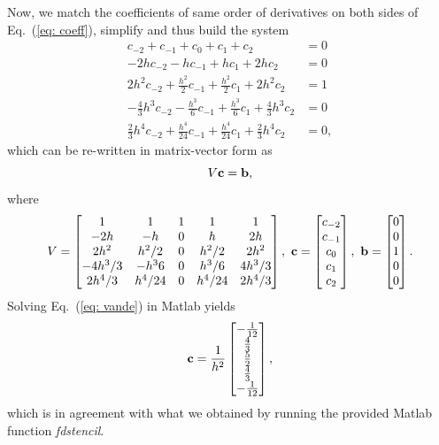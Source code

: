\documentclass[aps,prl,preprint,groupedaddress]{revtex4-1}
\begin{document}
Now, we match the coefficients of same order of derivatives on both sides of Eq.~(\ref{eq: coeff}), simplify and thus build the system
\begin{align*}
c_{-2}+c_{-1}+c_{0}+c_{1}+c_{2}&=0\nonumber\\
-2hc_{-2}-hc_{-1}+hc_{1}+2hc_{2}&=0\nonumber\\
2h^{2}c_{-2}+\frac{h^2}{2}c_{-1}+\frac{h^{2}}{2}c_{1}+2h^{2}c_{2}&=1\nonumber\\
-\frac{4}{3}h^{3}c_{-2}-\frac{h^{3}}{6}c_{-1}+\frac{h^{3}}{6}c_{1}+\frac{4}{3}h^{3}c_{2}&=0\nonumber\\
\frac{2}{3}h^{4}c_{-2}+\frac{h^{4}}{24}c_{-1}+\frac{h^4}{24}c_{1}+\frac{2}{3}h^{4}c_{2}&=0,
\end{align*}
which can be re-written in matrix-vector form as 
\begin{equation}\label{eq: vande}
V{\bf c} = {\bf b},
\end{equation}
where
\[
V=\begin{bmatrix}
1 & 1 & 1 & 1 & 1\\
-2h & -h & 0 & h &2h\\
2h^2 & h^{2}/2 & 0 & h^{2}/2 & 2h^{2}\\
-4h^{3}/3 & -h^{3}{6} & 0 & h^{3}/6 & 4h^{3}/3\\
2h^{4}/3 & h^{4}/24 & 0 & h^{4}/24 & 2h^{4}/3\\ 
\end{bmatrix},~{\bf c}=\begin{bmatrix}
c_{-2}\\
c_{-1}\\
c_{0}\\
c_{1}\\
c_{2}
\end{bmatrix},~{\bf b}=\begin{bmatrix}
0\\
0\\
1\\
0\\
0\\
\end{bmatrix}.
\]
Solving Eq.~(\ref{eq: vande}) in Matlab yields
\[
{\bf c} = \frac{1}{h^{2}}\begin{bmatrix}
-\frac{1}{12}\\
\frac{4}{3}\\
\frac{5}{2}\\
\frac{4}{3}\\
-\frac{1}{12}
\end{bmatrix},
\]
which is in agreement with what we obtained by running the provided Matlab function \textit{fdstencil}.
\end{document}
